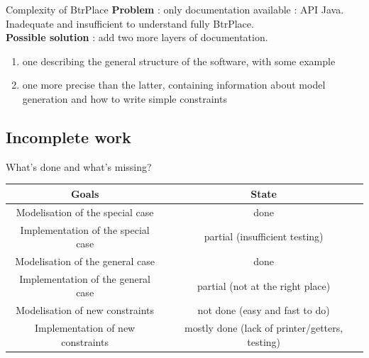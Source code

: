 \documentclass{beamer}
\begin{document}
\begin{frame}{Complexity of BtrPlace}
\textbf{Problem} : only documentation available : API Java.
Inadequate and insufficient to understand fully BtrPlace.\\
\pause\textbf{Possible solution} : add two more layers of documentation.
\begin{enumerate}
	\item one describing the general structure of the software, with
		some example
	\item one more precise than the latter, containing information about
		model generation and how to write simple constraints
\end{enumerate}
\end{frame}

\subsection{Incomplete work}
\begin{frame}{What's done and what's missing?}
\begin{center}
\begin{scriptsize}
\begin{tabular}{c|c}
	\textbf{Goals} & \textbf{State}\\
	\hline
	\hline
	Modelisation of the special case & done \\
	\hline
	Implementation of the special case & partial (insufficient testing) \\
	\hline
	Modelisation of the general case & done \\
	\hline
	Implementation of the general case & partial (not at the right place) \\
	\hline
	Modelisation of new constraints & not done (easy and fast to do) \\
	\hline
	Implementation of new constraints & mostly done (lack of printer/getters, testing) \\
	\hline
\end{tabular}
\end{scriptsize}
\end{center}
\end{frame}
\end{document}

